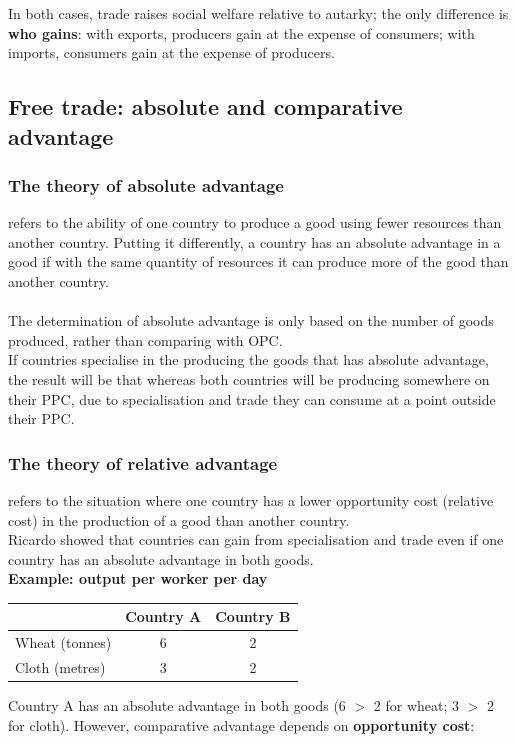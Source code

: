 In both cases, trade raises social welfare relative to autarky; the only difference is \textbf{who gains}: with exports, producers gain at the expense of consumers; with imports, consumers gain at the expense of producers.
\subsection{Free trade: absolute and comparative advantage}
\subsubsection*{The theory of absolute advantage}
 refers to the ability of one country to produce a good using fewer resources than another country. Putting it differently, a country has an absolute advantage in a good if with the same quantity of resources it can produce more of the good than another country.\\\\
The determination of absolute advantage is only based on the number of goods produced, rather than comparing with OPC.\\
If countries specialise in the producing the goods that has absolute advantage, the result will be that whereas both countries will be producing somewhere on their PPC, due to specialisation and trade they can consume at a point outside their PPC.
\subsubsection*{The theory of relative advantage}
 refers to the situation where one country has a lower opportunity cost (relative cost) in the production of a good than another country.\\
Ricardo showed that countries can gain from specialisation and trade even if one country has an absolute advantage in both goods.\\
\textbf{Example: output per worker per day}
\begin{center}
\begin{tabular}{lcc}
\toprule
& \textbf{Country A} & \textbf{Country B} \\
\midrule
Wheat (tonnes) & 6 & 2 \\
Cloth (metres) & 3 & 2 \\
\bottomrule
\end{tabular}
\end{center}
Country A has an absolute advantage in both goods (6 $>$ 2 for wheat; 3 $>$ 2 for cloth). However, comparative advantage depends on \textbf{opportunity cost}:

